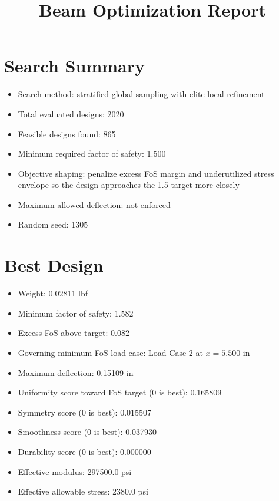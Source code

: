 \documentclass[11pt]{article}
\title{Beam Optimization Report}
\date{}
\begin{document}
\maketitle

\section*{Search Summary}
\begin{itemize}
\item Search method: stratified global sampling with elite local refinement
\item Total evaluated designs: 2020
\item Feasible designs found: 865
\item Minimum required factor of safety: 1.500
\item Objective shaping: penalize excess FoS margin and underutilized stress envelope so the design approaches the 1.5 target more closely
\item Maximum allowed deflection: not enforced
\item Random seed: 1305
\end{itemize}

\section*{Best Design}
\begin{itemize}
\item Weight: 0.02811 lbf
\item Minimum factor of safety: 1.582
\item Excess FoS above target: 0.082
\item Governing minimum-FoS load case: Load Case 2 at $x=5.500$ in
\item Maximum deflection: 0.15109 in
\item Uniformity score toward FoS target (0 is best): 0.165809
\item Symmetry score (0 is best): 0.015507
\item Smoothness score (0 is best): 0.037930
\item Durability score (0 is best): 0.000000
\item Effective modulus: 297500.0 psi
\item Effective allowable stress: 2380.0 psi
\end{itemize}
\end{document}
